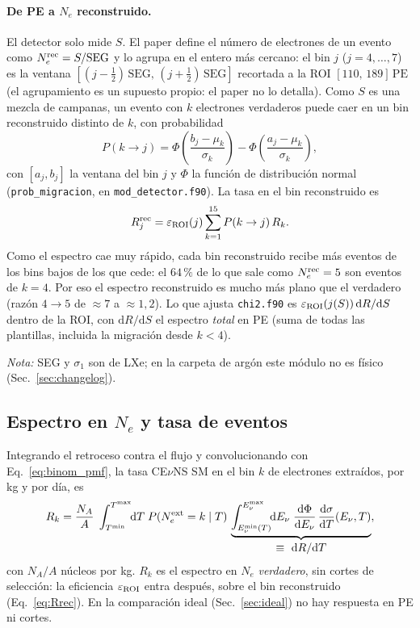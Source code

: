 \documentclass[11pt,a4paper]{article}
\newcommand{\Enu}{E_{\nu}}
\newcommand{\Tnr}{T}
\newcommand{\Ne}{N_{e}}
\newcommand{\code}[1]{\texttt{#1}}
\newcommand{\dd}{\mathrm{d}}
\begin{document}
\paragraph{De PE a $\Ne$ reconstruido.} El detector solo mide $S$. El paper define
el n\'umero de electrones de un evento como $\Ne^{\rm rec}=S/\mathrm{SEG}$ y lo
agrupa en el entero m\'as cercano: el bin $j$ ($j=4,\dots,7$) es la ventana
$[(j-\tfrac12)\,\mathrm{SEG},\,(j+\tfrac12)\,\mathrm{SEG}]$ recortada a la ROI
$[110,\,189]\,\mathrm{PE}$ (el agrupamiento es un supuesto propio: el paper no lo
detalla). Como $S$ es una mezcla de campanas, un evento con $k$ electrones
verdaderos puede caer en un bin reconstruido distinto de $k$, con probabilidad
\begin{equation}
  \label{eq:migracion}
  P(k\to j)=\Phi\!\left(\frac{b_{j}-\mu_{k}}{\sigma_{k}}\right)
           -\Phi\!\left(\frac{a_{j}-\mu_{k}}{\sigma_{k}}\right),
\end{equation}
con $[a_{j},b_{j}]$ la ventana del bin $j$ y $\Phi$ la funci\'on de distribuci\'on
normal (\code{prob\_migracion}, en \code{mod\_detector.f90}). La tasa en el bin
reconstruido es
\begin{equation}
  \label{eq:Rrec}
  R^{\rm rec}_{j}=\varepsilon_{\rm ROI}(j)\sum_{k=1}^{15}P(k\to j)\,R_{k}.
\end{equation}
Como el espectro cae muy r\'apido, cada bin reconstruido recibe m\'as eventos de
los bins bajos de los que cede: el $64\,\%$ de lo que sale como
$\Ne^{\rm rec}=5$ son eventos de $k=4$. Por eso el espectro reconstruido es mucho
m\'as plano que el verdadero (raz\'on $4\!\to\!5$ de $\approx7$ a $\approx1{,}2$).
Lo que ajusta \code{chi2.f90} es $\varepsilon_{\rm ROI}(j(S))\,\dd R/\dd S$ dentro
de la ROI, con $\dd R/\dd S$ el espectro \emph{total} en PE (suma de todas las
plantillas, incluida la migraci\'on desde $k<4$).

\emph{Nota:} SEG y $\sigma_{1}$ son de LXe; en la carpeta de arg\'on este
m\'odulo no es f\'isico (Sec.~\ref{sec:changelog}).

\subsection{Espectro en $\Ne$ y tasa de eventos}
\label{sec:Rk}

Integrando el retroceso contra el flujo y convolucionando con
Eq.~\eqref{eq:binom_pmf}, la tasa CE$\nu$NS SM en el bin $k$ de electrones
extra\'idos, por kg y por d\'ia, es
\begin{equation}
  \label{eq:Rk_eq}
  R_{k}
  = \frac{N_{A}}{A}\;
    \int_{\Tnr^{\min}}^{\Tnr^{\max}}\!\!\dd\Tnr\;
      P(\Ne^{\rm ext}=k\mid\Tnr)\,
      \underbrace{\int_{\Enu^{\min}(\Tnr)}^{\Enu^{\max}}\!\!\dd\Enu\;
        \frac{\dd\Phi}{\dd\Enu}\,
        \frac{\dd\sigma}{\dd\Tnr}(\Enu,\Tnr)}_{\displaystyle \equiv\ \dd R/\dd\Tnr},
\end{equation}
con $N_{A}/A$ n\'ucleos por kg. $R_{k}$ es el espectro en $\Ne$ \emph{verdadero},
sin cortes de selecci\'on: la eficiencia $\varepsilon_{\rm ROI}$ entra despu\'es,
sobre el bin reconstruido (Eq.~\eqref{eq:Rrec}). En la comparaci\'on ideal
(Sec.~\ref{sec:ideal}) no hay respuesta en PE ni cortes.
\end{document}
